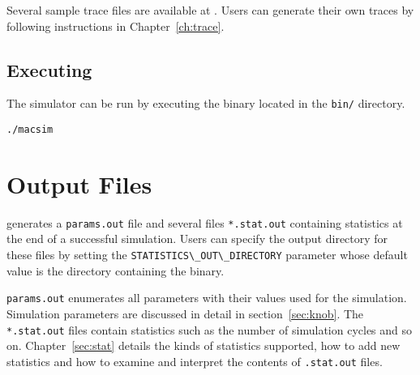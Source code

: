 Several sample trace files are available at
. Users can generate their own
traces by following instructions in Chapter~\ref{ch:trace}.


\subsection*{Executing}

The \SIM simulator can be run by executing the \bin binary located in the
\Verb+bin/+ directory.

\begin{Verbatim}
./macsim
\end{Verbatim}



\section{Output Files}

\SIM generates a \Verb+params.out+ file and several files \Verb+*.stat.out+
containing statistics at the end of a successful simulation. Users can specify
the output directory for these files by setting the
\Verb+STATISTICS\_OUT\_DIRECTORY+ parameter whose default value is the
directory containing the \bin binary.


\noindent \Verb+params.out+ enumerates all parameters with their values used
for the simulation. Simulation parameters are discussed in detail in 
section~\ref{sec:knob}. The \Verb+*.stat.out+ files contain statistics such as the number
of simulation cycles and so on. Chapter~\ref{sec:stat} details the kinds of
statistics supported, how to add new statistics and how to examine and
interpret the contents of \Verb+.stat.out+ files.


